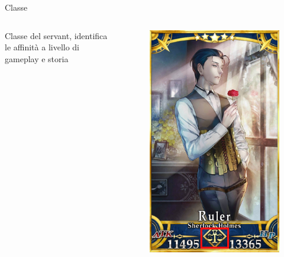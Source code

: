 \documentclass{beamer}
\begin{document}
\begin{darkframes}
  \begin{frame}{Classe}
    \begin{columns}
      \begin{column}{0.5\textwidth}
        Classe del servant, identifica le affinità a livello di gameplay e storia
      \end{column}
      \begin{column}{0.5\textwidth}
        \begin{figure}
          \centering
          \includegraphics[height=0.65\textheight]{./images/servant_class.png}
        \end{figure}
      \end{column}
    \end{columns}
  \end{frame}


\end{darkframes}
\end{document}
